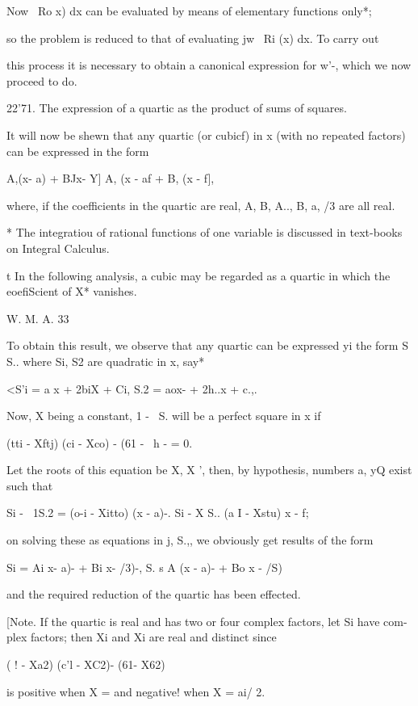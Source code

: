 Now \ Ro x) dx can be evaluated by means of elementary functions
only*;

so the problem is reduced to that of evaluating jw~ Ri (x) dx. To
carry out

this process it is necessary to obtain a canonical expression for w'-,
which we now proceed to do.

22'71. The expression of a quartic as the product of sums of squares.

It will now be shewn that any quartic (or cubicf) in x (with no
repeated factors) can be expressed in the form

 A,(x- a) + BJx- Y] A, (x - af + B, (x - f],

where, if the coefficients in the quartic are real, A, B, A.., B,
a, /3 are all real.

* The integratiou of rational functions of one variable is discussed
in text-books on Integral Calculus.

t In the following analysis, a cubic may be regarded as a quartic in
which the eoefiScient of X* vanishes.

W. M. A. 33

%
%

To obtain this result, we observe that any quartic can be expressed yi
the form S S.. where Si, S2 are quadratic in x, say*

<S'i = a x + 2biX + Ci, S.2 = aox- + 2h..x + c.,.

Now, X being a constant, 1 - \ S. will be a perfect square in x if

(tti - Xftj) (ci - Xco) - (61 - \ h - = 0.

Let the roots of this equation be X, X ', then, by hypothesis,
numbers a, yQ exist such that

Si - \ 1S.2 = (o-i - Xitto) (x - a)-. Si - X S.. (a I - Xstu) x - f;

on solving these as equations in j, S.,, we obviously get results of
the form

Si = Ai x- a)- + Bi x- /3)-, S. s A (x - a)- + Bo x - /S)

and the required reduction of the quartic has been effected.

[Note. If the quartic is real and has two or four complex factors, let
Si have com- plex factors; then Xi and Xi are real and distinct since

( ! - Xa2) (c'l - XC2)- (61- X62)

is positive when X = and negative! when X = ai/ 2.

